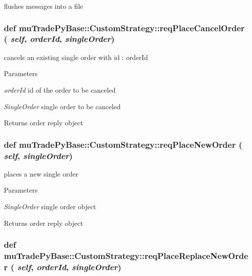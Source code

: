 flushes messages into a file \hypertarget{classmuTradePyBase_1_1CustomStrategy_a960f1c0ee467c21a732e1ae080b39dcb}{
\subsubsection[{reqPlaceCancelOrder}]{\setlength{\rightskip}{0pt plus 5cm}def muTradePyBase::CustomStrategy::reqPlaceCancelOrder ( {\em self}, \/   {\em orderId}, \/   {\em singleOrder})}}
\label{classmuTradePyBase_1_1CustomStrategy_a960f1c0ee467c21a732e1ae080b39dcb}


cancels an existing single order with id : orderId 
\begin{DoxyParams}{Parameters}
\item[{\em orderId}]id of the order to be canceled \item[{\em SingleOrder}]single order to be canceled \end{DoxyParams}
\begin{DoxyReturn}{Returns}
order reply object 
\end{DoxyReturn}
\hypertarget{classmuTradePyBase_1_1CustomStrategy_ade3e0161fb897eed61c2ac3e1823ff8f}{
\subsubsection[{reqPlaceNewOrder}]{\setlength{\rightskip}{0pt plus 5cm}def muTradePyBase::CustomStrategy::reqPlaceNewOrder ( {\em self}, \/   {\em singleOrder})}}
\label{classmuTradePyBase_1_1CustomStrategy_ade3e0161fb897eed61c2ac3e1823ff8f}


places a new single order 
\begin{DoxyParams}{Parameters}
\item[{\em SingleOrder}]single order object \end{DoxyParams}
\begin{DoxyReturn}{Returns}
order reply object 
\end{DoxyReturn}
\hypertarget{classmuTradePyBase_1_1CustomStrategy_aa6cbf9a067fcc64004f847d80913621c}{
\subsubsection[{reqPlaceReplaceNewOrder}]{\setlength{\rightskip}{0pt plus 5cm}def muTradePyBase::CustomStrategy::reqPlaceReplaceNewOrder ( {\em self}, \/   {\em orderId}, \/   {\em singleOrder})}}
\label{classmuTradePyBase_1_1CustomStrategy_aa6cbf9a067fcc64004f847d80913621c}


